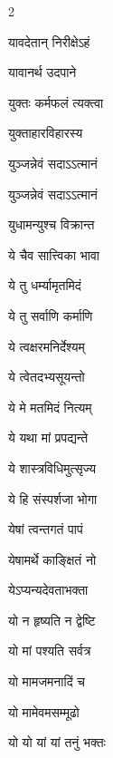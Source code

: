 \begin{multicols}{2}
\begin{indexlist}
\item यावदेतान् निरीक्षेऽहं \dotfill {}
\item यावानर्थ उदपाने \dotfill {}
\item युक्तः कर्मफलं त्यक्त्वा \dotfill {}
\item युक्ताहारविहारस्य \dotfill {}
\item युञ्जन्नेवं सदाऽऽत्मानं \dotfill {}
\item युञ्जन्नेवं सदाऽऽत्मानं \dotfill {}
\item युधामन्युश्च विक्रान्त \dotfill {}
\item ये चैव सात्त्विका भावा \dotfill {}
\item ये तु धर्म्यामृतमिदं \dotfill {}
\item ये तु सर्वाणि कर्माणि \dotfill {}
\item ये त्वक्षरमनिर्देश्यम् \dotfill {}
\item ये त्वेतदभ्यसूयन्तो \dotfill {}
\item ये मे मतमिदं नित्यम् \dotfill {}
\item ये यथा मां प्रपद्यन्ते \dotfill {}
\item ये शास्त्रविधिमुत्सृज्य \dotfill {}
\item ये हि संस्पर्शजा भोगा \dotfill {}
\item येषां त्वन्तगतं पापं \dotfill {}
\item येषामर्थे काङ्क्षितं नो \dotfill {}
\item येऽप्यन्यदेवताभक्ता \dotfill {}
\item यो न हृष्यति न द्वेष्टि \dotfill {}
\item यो मां पश्यति सर्वत्र \dotfill {}
\item यो मामजमनादिं च \dotfill {}
\item यो मामेवमसम्मूढो \dotfill {}
\item यो यो यां यां तनुं भक्तः \dotfill {}

\end{indexlist}
\end{multicols}
